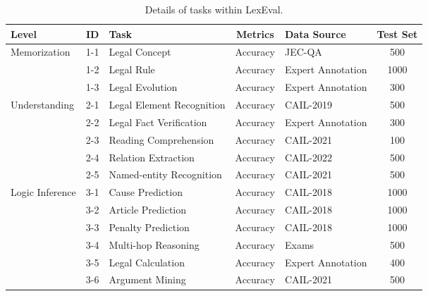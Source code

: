 \begin{table*}[t]
\centering
\small
\caption{Details of tasks within LexEval.}
\begin{tabular}{lclclc}
\hline
Level                            & ID  & Task                          & Metrics & Data Source            & Test Set \\ \hline
\multirow{3}{*}{Memorization}    & 1-1 & Legal Concept                 & Accuracy    & JEC-QA~\cite{zhong2020jec}           & 500      \\
                                 & 1-2 & Legal Rule                    & Accuracy    & Expert Annotation & 1000     \\
                                 & 1-3 & Legal Evolution               & Accuracy    & Expert Annotation & 300      \\ \hline
\multirow{5}{*}{Understanding}   & 2-1 & Legal Element Recognition     & Accuracy    & CAIL-2019         & 500      \\
                                 & 2-2 & Legal Fact Verification       & Accuracy    & Expert Annotation & 300      \\
                                 & 2-3 & Reading Comprehension         & Accuracy    & CAIL-2021         & 100      \\
                                 & 2-4 & Relation Extraction           & Accuracy    & CAIL-2022         & 500      \\
                                 & 2-5 & Named-entity Recognition      & Accuracy    & CAIL-2021         & 500      \\ \hline
\multirow{6}{*}{Logic Inference} & 3-1 & Cause Prediction              & Accuracy    & CAIL-2018         & 1000     \\
                                 & 3-2 & Article Prediction            & Accuracy    & CAIL-2018         & 1000     \\
                                 & 3-3 & Penalty Prediction            & Accuracy    & CAIL-2018         & 1000      \\
                                 & 3-4 & Multi-hop Reasoning           & Accuracy    & Exams             & 500      \\
                                 & 3-5 & Legal Calculation             & Accuracy    & Expert Annotation & 400      \\
                                 & 3-6 & Argument Mining               & Accuracy    & CAIL-2021         & 500      \\ \hline

\end{tabular}
\end{table*}
